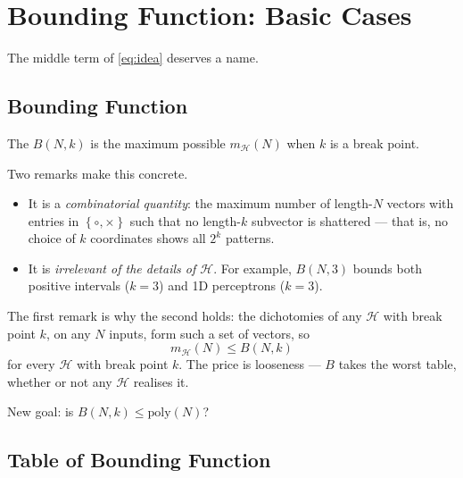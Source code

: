 \section{Bounding Function: Basic Cases}\label{sec:bound-basic}


The middle term of \autoref{eq:idea} deserves a name.

\subsection{Bounding Function}

\begin{definition}\label{def:bounding}
    The  \(B(N, k)\) is the maximum possible
    \(m_{\mathcal{H}}(N)\) when \(k\) is a break point.
\end{definition}

Two remarks make this concrete.

\begin{itemize}
    \item It is a \emph{combinatorial quantity}: the maximum number of
        length-\(N\) vectors with entries in \(\left\{ \circ, \times
        \right\}\) such that no length-\(k\) subvector is shattered --- that
        is, no choice of \(k\) coordinates shows all \(2^k\) patterns.
    \item It is \emph{irrelevant of the details of \(\mathcal{H}\)}. For
        example, \(B(N, 3)\) bounds both positive intervals (\(k = 3\)) and
        1D perceptrons (\(k = 3\)).
\end{itemize}

The first remark is why the second holds: the dichotomies of any
\(\mathcal{H}\) with break point \(k\), on any \(N\) inputs, form such a set
of vectors, so
\[
    m_{\mathcal{H}}(N) \le B(N, k)
\]
for every \(\mathcal{H}\) with break point \(k\). The price is looseness ---
\(B\) takes the worst table, whether or not any \(\mathcal{H}\) realises it.

\begin{question}\label{q:B-poly}
    New goal: is \(B(N, k) \le \mathrm{poly}(N)\)?
\end{question}

\subsection{Table of Bounding Function}

